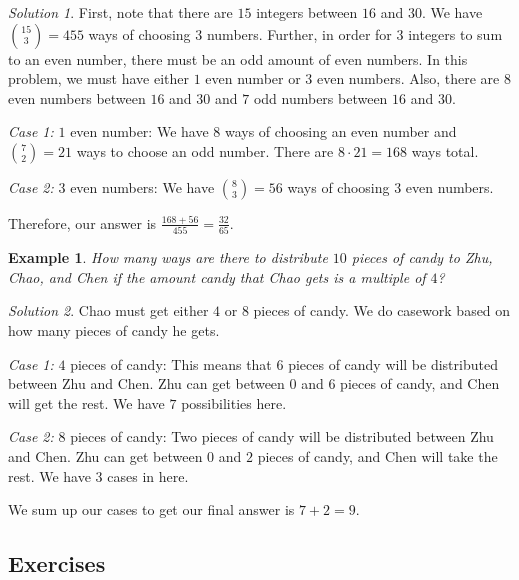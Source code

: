 \documentclass[letterpaper]{article}
\newtheorem{example}[thm]{Example}
\theoremstyle{remark}
\newtheorem*{solution}{Solution}
\theoremstyle{definition}
\begin{document}
\begin{solution}
First, note that there are $15$ integers between $16$ and $30$. We have $\binom{15}{3}=455$ ways of choosing $3$ numbers. Further, in order for $3$ integers to sum to an even number, there must be an odd amount of even numbers. In this problem, we must have either $1$ even number or $3$ even numbers. Also, there are $8$ even numbers between $16$ and $30$ and $7$ odd numbers between $16$ and $30$.
\newline

\textit{Case 1:} $1$ even number: We have $8$ ways of choosing an even number and $\binom{7}{2}=21$ ways to choose an odd number. There are $8\cdot 21=168$ ways total.
\newline

\textit{Case 2:} $3$ even numbers: We have $\binom{8}{3}=56$ ways of choosing $3$ even numbers. 
\newline

Therefore, our answer is $\frac{168+56}{455}=\frac{32}{65}$.

\end{solution}

\bigskip

\begin{example}
How many ways are there to distribute $10$ pieces of candy to Zhu, Chao, and Chen if the amount candy that Chao gets is a multiple of $4$?
\end{example}

\begin{solution}
Chao must get either $4$ or $8$ pieces of candy. We do casework based on how many pieces of candy he gets.
\newline

\textit{Case 1:} $4$ pieces of candy: This means that $6$ pieces of candy will be distributed between Zhu and Chen. Zhu can get between $0$ and $6$ pieces of candy, and Chen will get the rest. We have $7$ possibilities here.
\newline

\textit{Case 2:} $8$ pieces of candy: Two pieces of candy will be distributed between Zhu and Chen. Zhu can get between $0$ and $2$ pieces of candy, and Chen will take the rest. We have $3$ cases in here.
\newline

We sum up our cases to get our final answer is $7+2=9$.
\end{solution}

\subsection*{Exercises}
\end{document}
